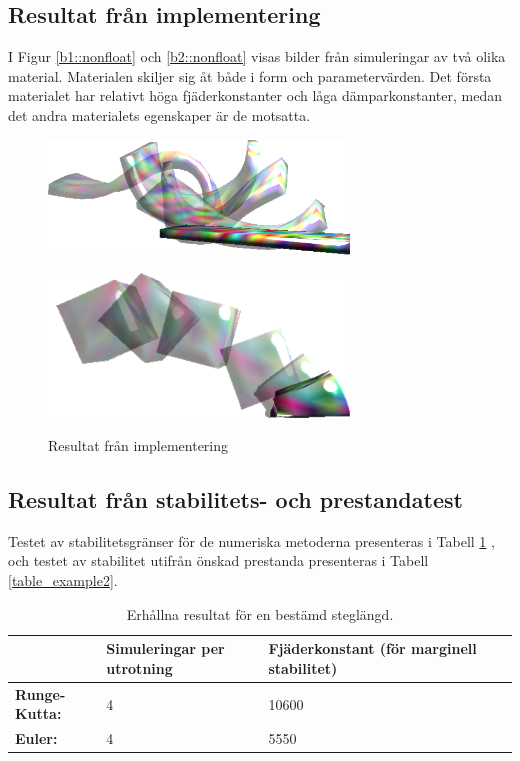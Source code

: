 \documentclass[a4paper,12pt,oneside,final,swedish]{extarticle}
\begin{document}
\subsection{Resultat från implementering}
I Figur \ref{b1::nonfloat} och \ref{b2::nonfloat} visas bilder från simuleringar av två olika material. Materialen skiljer sig åt både i form och parametervärden. Det första materialet har relativt höga fjäderkonstanter och låga dämparkonstanter, medan det andra materialets egenskaper är de motsatta.
\begin{figure} [h] 
 \begin{minipage}[b]{.5\linewidth}
    \centering
    \includegraphics[width=8cm]{Bilder/Anim1.png} 
    \subcaption{}\label{b1::nonfloat}
  \end{minipage}
 \begin{minipage}[b]{.5\linewidth}
    \centering
    \includegraphics[width=8cm]{Bilder/Anim2.png} 
    \subcaption{}\label{b2::nonfloat}
  \end{minipage}
  \caption{Resultat från implementering}
  \label{res_imp::nonfloat}
\end{figure}


\subsection{Resultat från stabilitets- och prestandatest}
Testet av stabilitetsgränser för de numeriska metoderna presenteras i Tabell \ref{table_example1} , och testet av stabilitet utifrån önskad prestanda presenteras i Tabell \ref{table_example2}.
\begin{table}[htbp]
    \caption{Erhållna resultat för en bestämd steglängd.}
    \label{table_example1}
    \begin{tabular*}{\hsize}{lllll}
      \hline %
      & \bfseries{Simuleringar per utrotning} &  \bfseries{Fjäderkonstant (för marginell stabilitet)}\\
      \hline
      \bfseries Runge-Kutta: & 4 & 10600\\
      \bfseries Euler: &4 & 5550\\
      \hline
    \end{tabular*}
\end{table}
\end{document}

